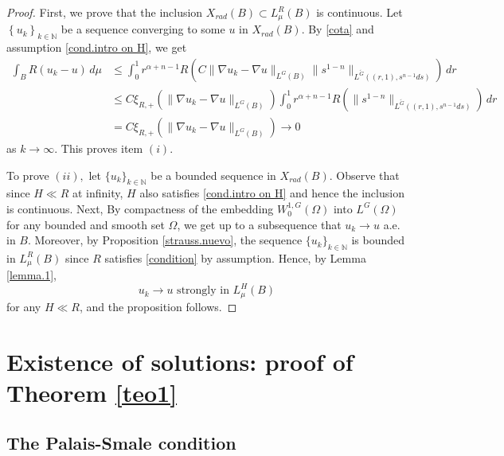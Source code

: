 \documentclass[leqno,twoside, 12pt]{amsart}
\theoremstyle{plain}
\numberwithin{equation}{section} \numberwithin{figure}{section}
\theoremstyle{definition}
\numberwithin{equation}{section}
\newcommand{\R}{\mathbb{R}}
\newcommand{\N}{\mathbb{N}}
\begin{document}
\begin{proof}
First, we prove that the inclusion $X_{rad}(B)\subset L_{\mu}^R(B)$ is continuous. Let  $\left\lbrace u_k \right\rbrace_{k\in\N}$ be a sequence converging to some $u$ in $X_{rad}(B)$.  By  \eqref{cota} and assumption  \eqref{cond.intro on H}, we get
\begin{equation}
\begin{split}
\int_B R(u_k-u)\,d\mu & \leq \int_0^1 r^{\alpha+n-1} R\left(C\|\nabla u_k-\nabla u\|_{L^G(B)}\|s^{1-n}\|_{L^{\tilde{G}}((r, 1), s^{n-1}ds)}\right)\,dr\\& \leq C \xi_{R,+}(\|\nabla u_k-\nabla u\|_{L^G(B)})\int_0^1 r^{\alpha+n-1} R\left(\|s^{1-n}\|_{L^{\tilde{G}}((r, 1), s^{n-1}ds)}\right)\,dr \\ &  = C \xi_{R,+}(\|\nabla u_k-\nabla u\|_{L^G(B)}) \to 0
\end{split}
\end{equation}as $k\to \infty$. This proves item $(i)$. 

 

To prove $(ii),$ let $\{u_k\}_{k\in\N}$ be a bounded sequence in $X_{rad}(B)$. Observe that since $H\ll R$ at infinity, $H$ also satisfies \eqref{cond.intro on H} and hence the inclusion is continuous. Next, By compactness of the embedding $W^{1, G}_{0}(\Omega)$ into $L^G(\Omega)$ for any bounded and smooth set $\Omega$, we get up to a subsequence  that $u_k\to u$  a.e. in $B$. Moreover, by  Proposition \ref{strauss.nuevo}, the sequence $\{ u_k\}_{k\in\N}$ is bounded in $L_{\mu}^R(B)$ since $R$ satisfies \eqref{condition} by assumption. Hence, by Lemma \ref{lemma.1},
$$
 u_k \to  u \text{ strongly in } L_{\mu}^H(B)
$$
for any $H\ll R$, and the proposition follows.
\end{proof}

\bigskip
 
 
\section{Existence of solutions: proof of Theorem \ref{teo1} }  \label{sec.exist}
 
\subsection{The Palais-Smale condition}
\end{document}
